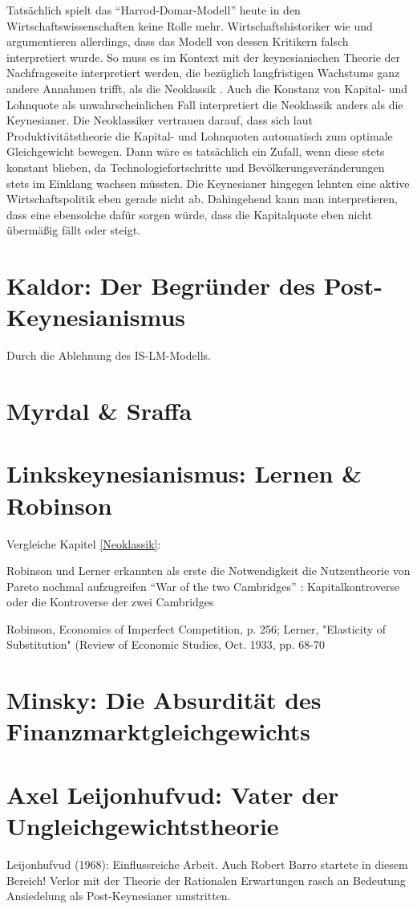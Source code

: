 Tatsächlich spielt das "`Harrod-Domar-Modell"' heute in den Wirtschaftswissenschaften keine Rolle mehr. Wirtschaftshistoriker wie \textcite{Berg2013} und \textcite{Boianovsky2018} argumentieren allerdings, dass das Modell von dessen Kritikern falsch interpretiert wurde. So muss es im Kontext mit der keynesianischen Theorie der Nachfrageseite interpretiert werden, die bezüglich langfristigen Wachstums ganz andere Annahmen trifft, als die Neoklassik \parencite[S. 479]{Boianovsky2018}. Auch die Konstanz von Kapital- und Lohnquote als unwahrscheinlichen Fall interpretiert die Neoklassik anders als die Keynesianer. Die Neoklassiker vertrauen darauf, dass sich laut Produktivitätstheorie die Kapital- und Lohnquoten automatisch zum optimale Gleichgewicht bewegen. Dann wäre es tatsächlich ein Zufall, wenn diese stets konstant blieben, da Technologiefortschritte und Bevölkerungsveränderungen stets im Einklang wachsen müssten. Die Keynesianer hingegen lehnten eine aktive Wirtschaftspolitik eben gerade nicht ab. Dahingehend kann man interpretieren, dass eine ebensolche dafür sorgen würde, dass die Kapitalquote eben nicht übermäßig fällt oder steigt.



\section{Kaldor: Der Begründer des Post-Keynesianismus}
Durch die Ablehnung des IS-LM-Modells.

\section{Myrdal \& Sraffa}

\section{Linkskeynesianismus: Lernen \& Robinson}

Vergleiche Kapitel \ref{Neoklassik}:

Robinson und Lerner erkannten als erste die Notwendigkeit die Nutzentheorie von Pareto nochmal aufzugreifen
"`War of the two Cambridges"' \parencite{Tobin1985}: Kapitalkontroverse oder die Kontroverse der zwei Cambridges

Robinson, Economics of Imperfect Competition, p. 256; Lerner, "Elasticity of Substitution" (Review of Economic Studies, Oct. 1933, pp. 68-70

\section{Minsky: Die Absurdität des Finanzmarktgleichgewichts}

\section{Axel Leijonhufvud: Vater der Ungleichgewichtstheorie}

Leijonhufvud (1968): Einflussreiche Arbeit. Auch Robert Barro startete in diesem Bereich!
Verlor mit der Theorie der Rationalen Erwartungen rasch an Bedeutung
Ansiedelung als Post-Keynesianer umstritten.




